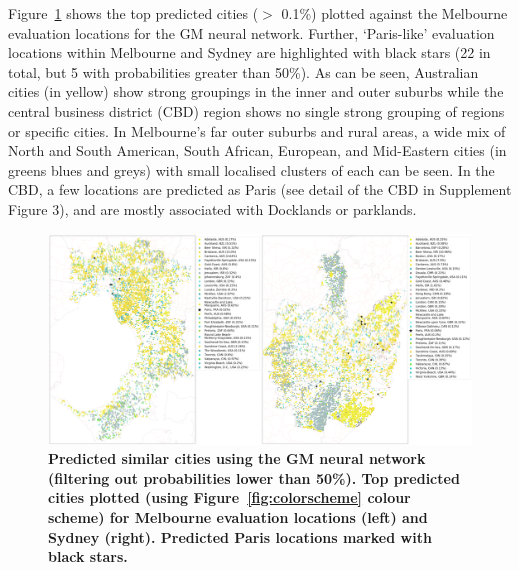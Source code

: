 \documentclass[Crown,sageh,times]{sagej}
\begin{document}
Figure~\ref{fig:melmaps} shows the top predicted cities ($>$ 0.1\%) plotted against the Melbourne evaluation locations for the GM neural network. Further, `Paris-like' evaluation locations within Melbourne and Sydney are highlighted with black stars (22 in total, but 5 with probabilities greater than 50\%). As can be seen, Australian cities (in yellow) show strong groupings in the inner and outer suburbs while the central business district (CBD) region shows no single strong grouping of regions or specific cities. In Melbourne's far outer suburbs and rural areas, a wide mix of North and South American, South African, European, and Mid-Eastern cities (in greens blues and greys) with small localised clusters of each can be seen. In the CBD, a few locations are predicted as Paris (see detail of the CBD in Supplement Figure 3), and are mostly associated with Docklands or parklands.





\begin{figure}[!htbp]
\centering   
\includegraphics[scale=0.10]{Images/Figure4GM.png}  


\caption{  \bf Predicted similar cities using the GM neural network (filtering out probabilities lower than 50\%). Top predicted cities plotted (using Figure~\ref{fig:colorscheme} colour scheme) for Melbourne evaluation locations (left) and Sydney (right). Predicted Paris locations marked with black stars.}    
 \label{fig:melmaps}  
\end{figure} 
\end{document}

